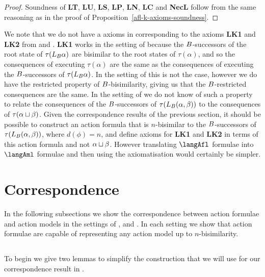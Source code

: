\begin{proof}
Soundness of {\bf LT}, {\bf LU}, {\bf LS}, {\bf LP}, {\bf LN}, {\bf LC} and {\bf NecL} follow from the same reasoning as in the proof of Proposition~\ref{afl-k-axioms-soundness}.
\end{proof}

We note that we do not have a axioms in \logicAflS{} corresponding to the axioms {\bf LK1} and {\bf LK2} from \axiomAflK{} and \axiomAflKFF{}.
{\bf LK1} works in the setting of \classK{} because the $B$-successors of the root state of $\tau(L_B \alpha)$ are bisimilar to the root states of $\tau(\alpha)$, and so the consequences of executing $\tau(\alpha)$ are the same as the consequences of executing the $B$-successors of $\tau(L_B \alpha)$.
In the setting of \classKFF{} this is not the case, however we do have the restricted property of $B$-bisimilarity, giving us that the $B$-restricted consequences are the same.
In the setting of \classS{} we do not know of such a property to relate the consequences of the $B$-successors of $\tau(L_B (\alpha, \beta))$ to the consequences of $\tau(\alpha \sqcup \beta)$.
Given the correspondence results of the previous section, it should be possible to construct an action formula that is $n$-bisimilar to the $B$-successors of $\tau(L_B (\alpha, \beta))$, where $d(\phi) = n$, and define axioms for {\bf LK1} and {\bf LK2} in terms of this action formula and not $\alpha \sqcup \beta$.
However translating $\langAfl$ formulae into $\langAml$ formulae and then using the axiomatisation \axiomAmlS{} would certainly be simpler.

\section{Correspondence}\label{correspondence}

In the following subsections we show the correspondence between action formulae and action models in the settings of \classK{}, \classKFF{} and \classS{}.
In each setting we show that action formulae are capable of representing any action model up to $n$-bisimilarity.

\subsection{\classK{}}

To begin we give two lemmas to simplify the construction that we will use for our correspondence result in \classK{}.

